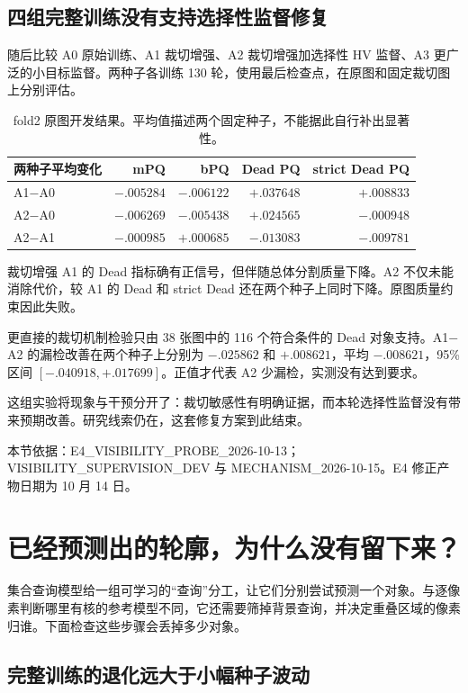 \documentclass[UTF8,zihao=-4,fontset=windows]{ctexart}
\newcommand{\src}[1]{\par{\footnotesize\color{gray}本节依据：#1}\par}
\begin{document}
\subsection{四组完整训练没有支持选择性监督修复}

随后比较 A0 原始训练、A1 裁切增强、A2 裁切增强加选择性 HV 监督、A3 更广泛的小目标监督。两种子各训练 130 轮，使用最后检查点，在原图和固定裁切图上分别评估。

\begin{table}[H]\centering\small
\begin{tabular}{lrrrr}\toprule
两种子平均变化 & mPQ & bPQ & Dead PQ & strict Dead PQ\\\midrule
A1$-$A0 & $-.005284$ & $-.006122$ & $+.037648$ & $+.008833$\\
A2$-$A0 & $-.006269$ & $-.005438$ & $+.024565$ & $-.000948$\\
A2$-$A1 & $-.000985$ & $+.000685$ & $-.013083$ & $-.009781$\\\bottomrule
\end{tabular}
\caption{fold2 原图开发结果。平均值描述两个固定种子，不能据此自行补出显著性。}
\end{table}

裁切增强 A1 的 Dead 指标确有正信号，但伴随总体分割质量下降。A2 不仅未能消除代价，较 A1 的 Dead 和 strict Dead 还在两个种子上同时下降。原图质量约束因此失败。

更直接的裁切机制检验只由 38 张图中的 116 个符合条件的 Dead 对象支持。A1$-$A2 的漏检改善在两个种子上分别为 $-.025862$ 和 $+.008621$，平均 $-.008621$，95\% 区间 $[-.040918,+.017699]$。正值才代表 A2 少漏检，实测没有达到要求。

这组实验将现象与干预分开了：裁切敏感性有明确证据，而本轮选择性监督没有带来预期改善。研究线索仍在，这套修复方案到此结束。

\src{E4\_\allowbreak{}VISIBILITY\_\allowbreak{}PROBE\_\allowbreak{}2026-10-13；VISIBILITY\_\allowbreak{}SUPERVISION\_\allowbreak{}DEV 与 MECHANISM\_\allowbreak{}2026-10-15。E4 修正产物日期为 10 月 14 日。}

\section{已经预测出的轮廓，为什么没有留下来？}

集合查询模型给一组可学习的“查询”分工，让它们分别尝试预测一个对象。与逐像素判断哪里有核的参考模型不同，它还需要筛掉背景查询，并决定重叠区域的像素归谁。下面检查这些步骤会丢掉多少对象。

\subsection{完整训练的退化远大于小幅种子波动}
\end{document}
